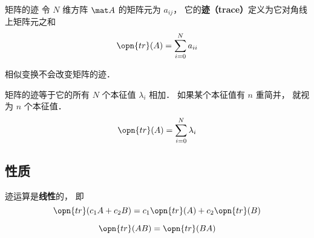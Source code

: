 
\begin{definition}{矩阵的迹}
令 $N$ 维方阵 $\mat A$ 的矩阵元为 $a_{ij}$， 它的\textbf{迹（trace）}定义为它对角线上矩阵元之和
\begin{equation}
\opn{tr}(A) = \sum_{i=0}^N a_{ii}
\end{equation}
\end{definition}

\begin{theorem}{}
相似变换不会改变矩阵的迹．
\end{theorem}

\begin{corollary}{}
矩阵的迹等于它的所有 $N$ 个本征值 $\lambda_i$ 相加． 如果某个本征值有 $n$ 重简并， 就视为 $n$ 个本征值．
\begin{equation}
\opn{tr}(A) = \sum_{i=0}^N \lambda_i
\end{equation}
\end{corollary}

\subsection{性质}
迹运算是\textbf{线性}的， 即
\begin{equation}
\opn{tr}(c_1A+c_2B) = c_1\opn{tr}(A) + c_2\opn{tr}(B)
\end{equation}

\begin{equation}
\opn{tr}(AB) = \opn{tr}(BA)
\end{equation}
